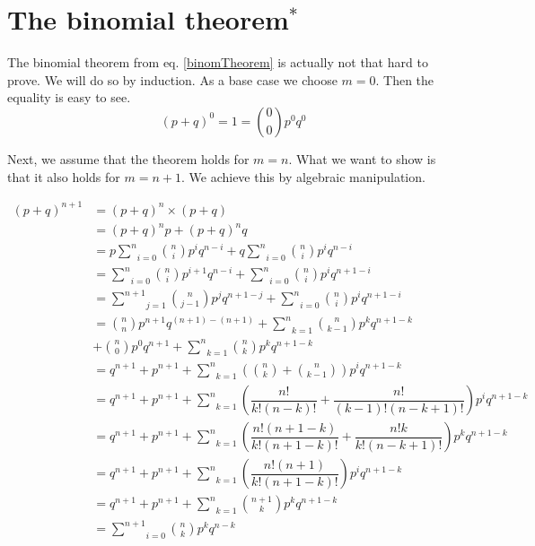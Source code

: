 \documentclass[a4paper,11pt,leqno]{report}
\begin{document}
\section{The binomial theorem$^{*}$}
The binomial theorem from eq. \ref{binomTheorem} is actually not that hard to prove. We will do so by
induction. As a base case we choose $ m = 0 $. Then the equality is easy to see.
\begin{equation}
(p + q)^{0} = 1 = \binom{0}{0}p^{0}q^{0}
\end{equation}

Next, we assume that the theorem holds for $ m = n $. What we want to show is that it also holds for
$ m = n + 1 $. We achieve this by algebraic manipulation.

\begin{align}
(p + q)^{n+1} &= (p + q)^{n} \times (p + q) \\
&= (p+q)^{n}p + (p+q)^{n}q \\
&= p\underset{i=0}{\overset{n}{\sum}} \binom{n}{i} p^{i}q^{n-i} + q\underset{i=0}{\overset{n}{\sum}} \binom{n}{i} p^{i}q^{n-i} \\
&= \underset{i=0}{\overset{n}{\sum}} \binom{n}{i} p^{i+1}q^{n-i} + \underset{i=0}{\overset{n}{\sum}} \binom{n}{i} p^{i}q^{n+1-i} \\
&= \underset{j=1}{\overset{n+1}{\sum}} \binom{n}{j-1} p^{j}q^{n+1-j} + \underset{i=0}{\overset{n}{\sum}} \binom{n}{i} p^{i}q^{n+1-i} \label{variableSwitch} \\
&= \binom{n}{n} p^{n+1}q^{(n+1)-(n+1)} + \underset{k=1}{\overset{n}{\sum}} \binom{n}{k-1} p^{k}q^{n+1-k} \label{pullOut} \\
&+ \binom{n}{0} p^{0}q^{n+1} + \underset{k=1}{\overset{n}{\sum}} \binom{n}{k} p^{k}q^{n+1-k} \nonumber \label{collapseSums} \\
&= q^{n+1} + p^{n+1} + \underset{k=1}{\overset{n}{\sum}} \left(\binom{n}{k} + \binom{n}{k-1}\right) p^{i}q^{n+1-k} \\
&= q^{n+1} + p^{n+1} + \underset{k=1}{\overset{n}{\sum}} \left(\dfrac{n!}{k!(n-k)!} + \dfrac{n!}{(k-1)!(n-k+1)!}\right) p^{i}q^{n+1-k} \\
&= q^{n+1} + p^{n+1} + \underset{k=1}{\overset{n}{\sum}} \left(\dfrac{n!(n+1-k)}{k!(n+1-k)!} + \dfrac{n!k}{k!(n-k+1)!}\right) p^{k}q^{n+1-k} \\
&= q^{n+1} + p^{n+1} + \underset{k=1}{\overset{n}{\sum}} \left(\dfrac{n!(n+1)}{k!(n+1-k)!}\right) p^{i}q^{n+1-k} \\
&= q^{n+1} + p^{n+1} + \underset{k=1}{\overset{n}{\sum}} \binom{n+1}{k} p^{k}q^{n+1-k} \\
&= \underset{i=0}{\overset{n+1}{\sum}} \binom{n}{k} p^{k}q^{n-k}
\end{align}
\end{document}
